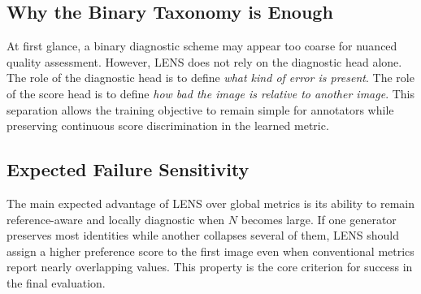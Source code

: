 \subsection{Why the Binary Taxonomy is Enough}
At first glance, a binary diagnostic scheme may appear too coarse for nuanced quality assessment. However, LENS does not rely on the diagnostic head alone. The role of the diagnostic head is to define \emph{what kind of error is present}. The role of the score head is to define \emph{how bad the image is relative to another image}. This separation allows the training objective to remain simple for annotators while preserving continuous score discrimination in the learned metric.

\subsection{Expected Failure Sensitivity}
The main expected advantage of LENS over global metrics is its ability to remain reference-aware and locally diagnostic when $N$ becomes large. If one generator preserves most identities while another collapses several of them, LENS should assign a higher preference score to the first image even when conventional metrics report nearly overlapping values. This property is the core criterion for success in the final evaluation.
